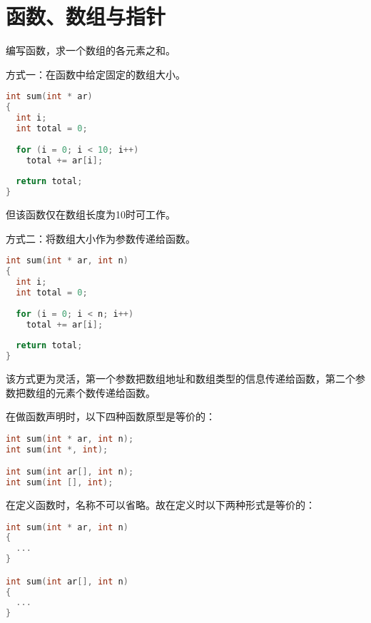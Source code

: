\section{函数、数组与指针}

\begin{frame}[fragile]\ft{\secname}
编写函数，求一个数组的各元素之和。
\end{frame}

\begin{frame}[fragile]\ft{\secname}
方式一：在函数中给定固定的数组大小。
\begin{lstlisting}[language=c,backgroundcolor=\color{red!20}]
int sum(int * ar)
{
  int i;
  int total = 0;
  
  for (i = 0; i < 10; i++)
    total += ar[i];
    
  return total;  
}
\end{lstlisting} \pause 
但该函数仅在数组长度为10时可工作。
\end{frame}

\begin{frame}[fragile]\ft{\secname}
方式二：将数组大小作为参数传递给函数。
\begin{lstlisting}[language=c,backgroundcolor=\color{red!20}]
int sum(int * ar, int n)
{
  int i;
  int total = 0;
  
  for (i = 0; i < n; i++)
    total += ar[i];
    
  return total;  
}
\end{lstlisting} \pause 
该方式更为灵活，第一个参数把数组地址和数组类型的信息传递给函数，第二个参数把数组的元素个数传递给函数。
\end{frame}

\begin{frame}[fragile]\ft{\secname}
在做函数声明时，以下四种函数原型是等价的：
\begin{lstlisting}[language=c,backgroundcolor=\color{red!20}]
int sum(int * ar, int n);
int sum(int *, int);

int sum(int ar[], int n);
int sum(int [], int);
\end{lstlisting}
\end{frame}

\begin{frame}[fragile]\ft{\secname}
在定义函数时，名称不可以省略。故在定义时以下两种形式是等价的：
\begin{lstlisting}[language=c,backgroundcolor=\color{red!20}]
int sum(int * ar, int n)
{
  ...
}

int sum(int ar[], int n)
{
  ...
}
\end{lstlisting}
\end{frame}

